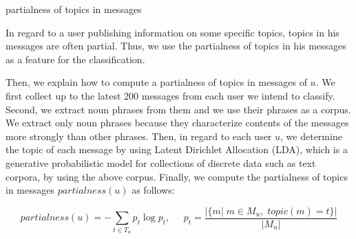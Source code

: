 \begin{description}
\bf {\item[(iv)] partialness of topics in messages}
\end{description}

In regard to a user publishing information on some specific topics,
topics in his messages are often partial.  Thus, we use the
partialness of topics in his messages as a feature for the
classification.

Then, we explain how to compute a partialness of topics in messages of
$u$.  We first collect up to the latest 200 messages from each user we
intend to classify.  Second,
we extract noun phrases from them and we use their phrases as a corpus.
We extract only noun phrases because they characterize contents of the
messages more strongly than other phrases.  Then, in regard to each user
$u$, we determine the topic of each message by
using Latent Dirichlet Allocation (LDA), which is a generative
probabilistic model for collections of discrete data such as text
corpora, by using the above corpus.  Finally, we compute the partialness of
topics in messages $\mathit{partialness}(u)$ as follows:

\vspace{-3ex}
\[
 \mathit{partialness}(u) = - \sum_{t \in T_u} p_t \log p_t,\;\;\;\;\;
 p_t = \frac{|\{m|\;m \in M_u,\;\mathit{topic}(m) = t\}|}{|M_u|}
\]
\vspace{-3ex}

